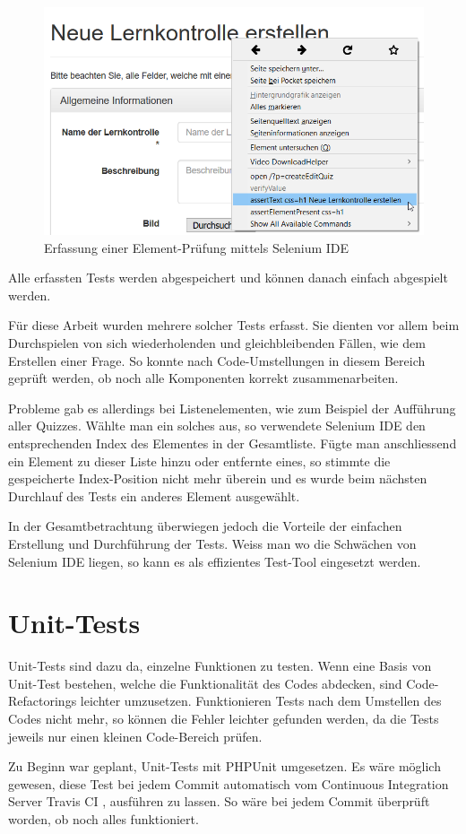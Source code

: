 \begin{figure}[H]
	\centering
	\includegraphics[width=.5\textwidth]{Images/seleniumIDE_Assert.PNG}
	\caption{Erfassung einer Element-Prüfung mittels Selenium IDE}
\end{figure}

Alle erfassten Tests werden abgespeichert und können danach einfach abgespielt werden.

Für diese Arbeit wurden mehrere solcher Tests erfasst. Sie dienten vor allem beim Durchspielen von sich wiederholenden und gleichbleibenden Fällen, wie dem Erstellen einer Frage. So konnte nach Code-Umstellungen in diesem Bereich geprüft werden, ob noch alle Komponenten korrekt zusammenarbeiten.

Probleme gab es allerdings bei Listenelementen, wie zum Beispiel der Aufführung aller Quizzes. Wählte man ein solches aus, so verwendete Selenium IDE den entsprechenden Index des Elementes in der Gesamtliste. Fügte man anschliessend ein Element zu dieser Liste hinzu oder entfernte eines, so stimmte die gespeicherte Index-Position nicht mehr überein und es wurde beim nächsten Durchlauf des Tests ein anderes Element ausgewählt.

In der Gesamtbetrachtung überwiegen jedoch die Vorteile der einfachen Erstellung und Durchführung der Tests. Weiss man wo die Schwächen von Selenium IDE liegen, so kann es als effizientes Test-Tool eingesetzt werden.


\section{Unit-Tests}
Unit-Tests sind dazu da, einzelne Funktionen zu testen. Wenn eine Basis von Unit-Test bestehen, welche die Funktionalität des Codes abdecken, sind Code-\gls{Refactoring}s leichter umzusetzen. Funktionieren Tests nach dem Umstellen des Codes nicht mehr, so können die Fehler leichter gefunden werden, da die Tests jeweils nur einen kleinen Code-Bereich prüfen.

Zu Beginn war geplant, Unit-Tests mit PHPUnit \cite{phpunit} umgesetzen. Es wäre möglich gewesen, diese Test bei jedem \gls{Commit} automatisch vom Continuous Integration Server Travis CI \cite{travisCI}, ausführen zu lassen. So wäre bei jedem \gls{Commit} überprüft worden, ob noch alles funktioniert.


